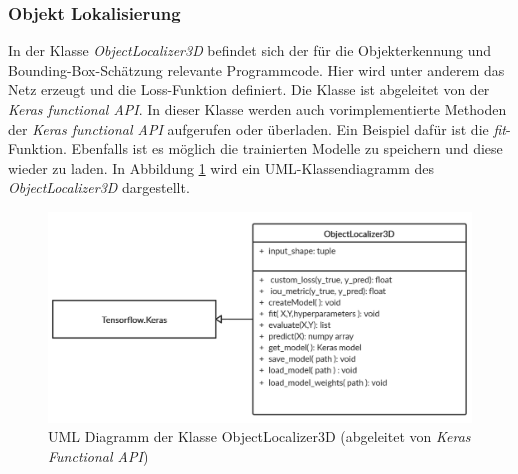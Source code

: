 \subsubsection{Objekt Lokalisierung}
In der Klasse \textit{ObjectLocalizer3D} befindet sich der für die Objekterkennung und Bounding-Box-Schätzung relevante Programmcode. Hier wird unter anderem das Netz erzeugt und die Loss-Funktion definiert. Die Klasse ist abgeleitet von der \textit{Keras functional API}. In dieser Klasse werden auch vorimplementierte Methoden der \textit{Keras functional API} aufgerufen oder überladen. Ein Beispiel dafür ist die \textit{fit}-Funktion. Ebenfalls ist es möglich die trainierten Modelle zu speichern und diese wieder zu laden. In Abbildung \ref{UML_localizer} wird ein UML-Klassendiagramm des \textit{ObjectLocalizer3D} dargestellt.  
\begin{figure}[!htb]
  \centering
  \includegraphics[width=14.2cm]{Abb/ULM_class_objectLocalizer.PNG}
  \caption{UML Diagramm der Klasse ObjectLocalizer3D (abgeleitet von \textit{Keras Functional API})}
  \label{UML_localizer}
\end{figure} 


  